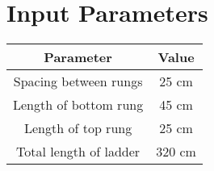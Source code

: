 \documentclass{article}
\begin{document}
\section*{Input Parameters}
\begin{center}
\begin{tabular}{|c|c|}
\hline
\textbf{Parameter} & \textbf{Value} \\
\hline
Spacing between rungs & 25 cm \\
Length of bottom rung & 45 cm \\
Length of top rung & 25 cm \\
Total length of ladder & 320 cm \\
\hline
\end{tabular}
\end{center}
\end{document}
